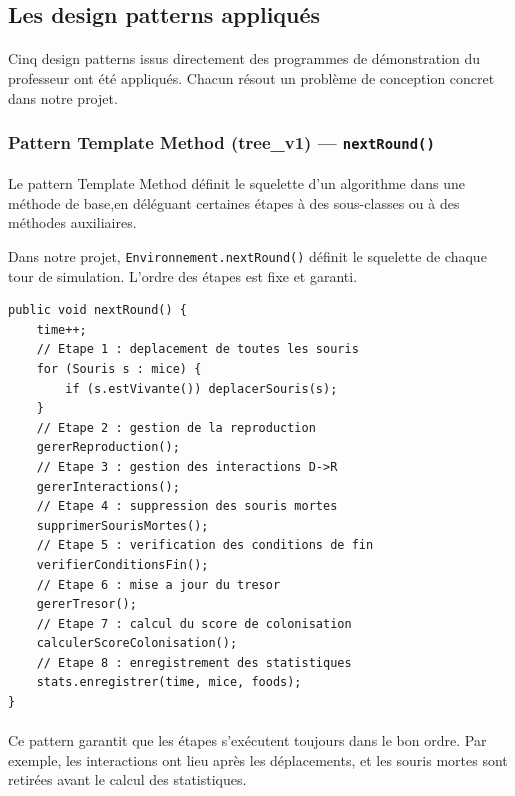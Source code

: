 \bigskip

\subsection{Les design patterns appliqués}

\paragraph{} Cinq design patterns issus directement des programmes de démonstration du professeur ont été appliqués. Chacun résout un problème de conception concret dans notre projet.

\subsubsection{Pattern Template Method (tree\_v1) --- \texttt{nextRound()}}

\paragraph{} Le pattern Template Method définit le squelette d'un algorithme dans une méthode de base,en déléguant certaines étapes à des sous-classes ou à des méthodes auxiliaires.

Dans notre projet, \texttt{Environnement.nextRound()} définit le squelette de chaque tour de simulation. L'ordre des étapes est fixe et garanti.

\begin{lstlisting}[caption={Squelette du Template Method nextRound()}]
public void nextRound() {
    time++;
    // Etape 1 : deplacement de toutes les souris
    for (Souris s : mice) {
        if (s.estVivante()) deplacerSouris(s);
    }
    // Etape 2 : gestion de la reproduction
    gererReproduction();
    // Etape 3 : gestion des interactions D->R
    gererInteractions();
    // Etape 4 : suppression des souris mortes
    supprimerSourisMortes();
    // Etape 5 : verification des conditions de fin
    verifierConditionsFin();
    // Etape 6 : mise a jour du tresor
    gererTresor();
    // Etape 7 : calcul du score de colonisation
    calculerScoreColonisation();
    // Etape 8 : enregistrement des statistiques
    stats.enregistrer(time, mice, foods);
}
\end{lstlisting}

\paragraph{} Ce pattern garantit que les étapes s'exécutent toujours dans le bon ordre. Par exemple, les interactions ont lieu après les déplacements, et les souris mortes sont retirées avant le calcul des statistiques.

